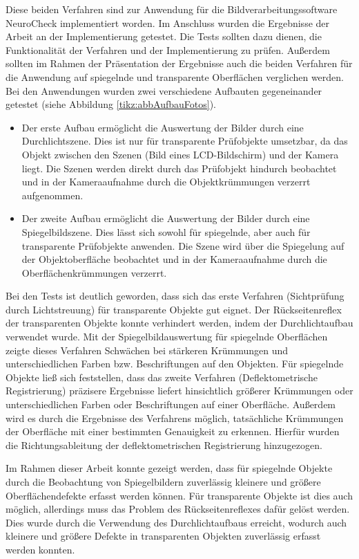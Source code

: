 %
Diese beiden Verfahren sind zur Anwendung für die Bildverarbeitungssoftware NeuroCheck implementiert worden.
Im Anschluss wurden die Ergebnisse der Arbeit an der Implementierung getestet.
Die Tests sollten dazu dienen, die Funktionalität der Verfahren und der Implementierung zu prüfen.
Außerdem sollten im Rahmen der Präsentation der Ergebnisse auch die beiden Verfahren für die Anwendung auf spiegelnde und transparente Oberflächen verglichen werden.
Bei den Anwendungen wurden zwei verschiedene Aufbauten gegeneinander getestet (siehe Abbildung \ref{tikz:abbAufbauFotos}).
%
\begin{itemize}
	\item Der erste Aufbau ermöglicht die Auswertung der Bilder durch eine Durchlichtszene. Dies ist nur für transparente Prüfobjekte umsetzbar, da das Objekt zwischen den Szenen (Bild eines LCD-Bildschirm) und der Kamera liegt. Die Szenen werden direkt durch das Prüfobjekt hindurch beobachtet und in der Kameraaufnahme durch die Objektkrümmungen verzerrt aufgenommen.
	
	\item Der zweite Aufbau ermöglicht die Auswertung der Bilder durch eine Spiegelbildszene. Dies lässt sich sowohl für spiegelnde, aber auch für transparente Prüfobjekte anwenden. Die Szene wird über die Spiegelung auf der Objektoberfläche beobachtet und in der Kameraaufnahme durch die Oberflächenkrümmungen verzerrt.
\end{itemize}
%
Bei den Tests ist deutlich geworden, dass sich das erste Verfahren (Sichtprüfung durch Lichtstreuung) für transparente Objekte gut eignet.
Der Rückseitenreflex der transparenten Objekte konnte verhindert werden, indem der Durchlichtaufbau verwendet wurde.
Mit der Spiegelbildauswertung für spiegelnde Oberflächen zeigte dieses Verfahren Schwächen bei stärkeren Krümmungen und unterschiedlichen Farben bzw. Beschriftungen auf den Objekten.
Für spiegelnde Objekte ließ sich feststellen, dass das zweite Verfahren (Deflektometrische Registrierung) präzisere Ergebnisse liefert hinsichtlich größerer Krümmungen oder unterschiedlichen Farben oder Beschriftungen auf einer Oberfläche.
Außerdem wird es durch die Ergebnisse des Verfahrens möglich, tatsächliche Krümmungen der Oberfläche mit einer bestimmten Genauigkeit zu erkennen.
Hierfür wurden die Richtungsableitung der deflektometrischen Registrierung hinzugezogen.

\p
Im Rahmen dieser Arbeit konnte gezeigt werden, dass für spiegelnde Objekte durch die Beobachtung von Spiegelbildern zuverlässig kleinere und größere Oberflächendefekte erfasst werden können.
Für transparente Objekte ist dies auch möglich, allerdings muss das Problem des Rückseitenreflexes dafür gelöst werden. 
Dies wurde durch die Verwendung des Durchlichtaufbaus erreicht, wodurch auch kleinere und größere Defekte in transparenten Objekten zuverlässig erfasst werden konnten.
